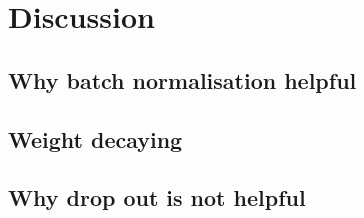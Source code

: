 \section{Discussion}
\subsection{Why batch normalisation helpful}
\subsection{Weight decaying}
\subsection{Why drop out is not helpful}
